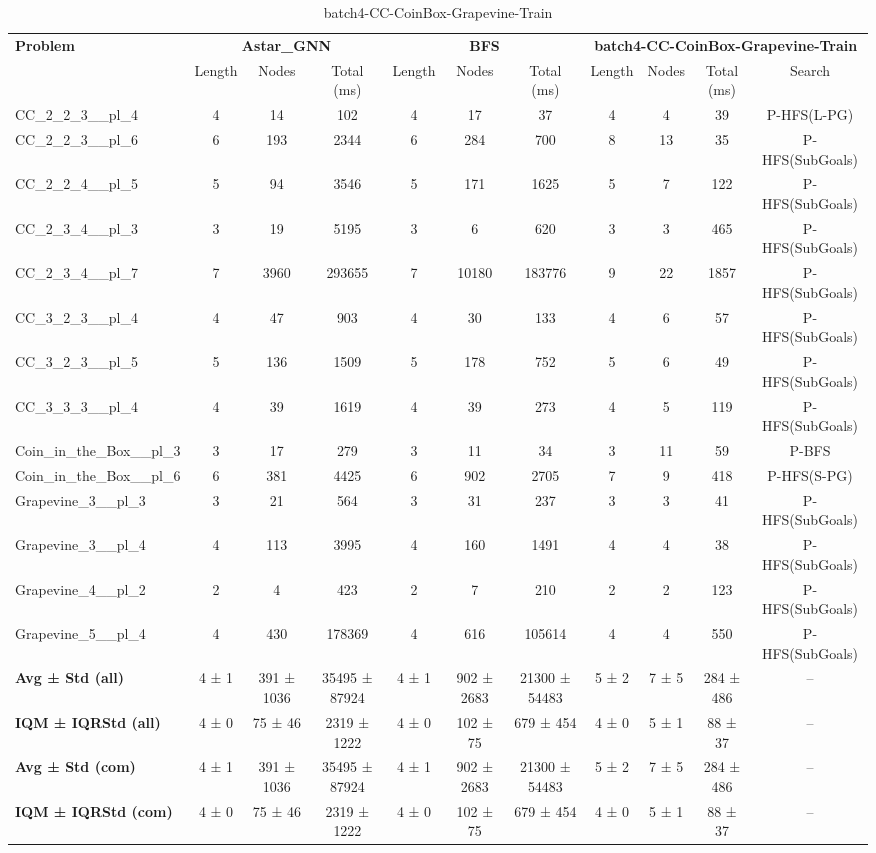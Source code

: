 \begin{table}[!ht]
\centering
\scriptsize
\begin{tabular}{l|ccc|ccc|cccc}
\multirow{2}{*}{\textbf{Problem}} & \multicolumn{3}{c|}{\textbf{Astar\_GNN}} & \multicolumn{3}{c|}{\textbf{BFS}} & \multicolumn{4}{c}{\textbf{batch4-CC-CoinBox-Grapevine-Train}} \\
\cline{2-11}
& Length & Nodes & Total (ms) & Length & Nodes & Total (ms) & Length & Nodes & Total (ms) & Search \\
\hline
CC\_2\_2\_3\_\_pl\_4 & 4 & 14 & 102 & 4 & 17 & 37 & 4 & 4 & 39 & P-HFS(L-PG) \\
CC\_2\_2\_3\_\_pl\_6 & 6 & 193 & 2344 & 6 & 284 & 700 & 8 & 13 & 35 & P-HFS(SubGoals) \\
CC\_2\_2\_4\_\_pl\_5 & 5 & 94 & 3546 & 5 & 171 & 1625 & 5 & 7 & 122 & P-HFS(SubGoals) \\
CC\_2\_3\_4\_\_pl\_3 & 3 & 19 & 5195 & 3 & 6 & 620 & 3 & 3 & 465 & P-HFS(SubGoals) \\
CC\_2\_3\_4\_\_pl\_7 & 7 & 3960 & 293655 & 7 & 10180 & 183776 & 9 & 22 & 1857 & P-HFS(SubGoals) \\
CC\_3\_2\_3\_\_pl\_4 & 4 & 47 & 903 & 4 & 30 & 133 & 4 & 6 & 57 & P-HFS(SubGoals) \\
CC\_3\_2\_3\_\_pl\_5 & 5 & 136 & 1509 & 5 & 178 & 752 & 5 & 6 & 49 & P-HFS(SubGoals) \\
CC\_3\_3\_3\_\_pl\_4 & 4 & 39 & 1619 & 4 & 39 & 273 & 4 & 5 & 119 & P-HFS(SubGoals) \\
Coin\_in\_the\_Box\_\_pl\_3 & 3 & 17 & 279 & 3 & 11 & 34 & 3 & 11 & 59 & P-BFS \\
Coin\_in\_the\_Box\_\_pl\_6 & 6 & 381 & 4425 & 6 & 902 & 2705 & 7 & 9 & 418 & P-HFS(S-PG) \\
Grapevine\_3\_\_pl\_3 & 3 & 21 & 564 & 3 & 31 & 237 & 3 & 3 & 41 & P-HFS(SubGoals) \\
Grapevine\_3\_\_pl\_4 & 4 & 113 & 3995 & 4 & 160 & 1491 & 4 & 4 & 38 & P-HFS(SubGoals) \\
Grapevine\_4\_\_pl\_2 & 2 & 4 & 423 & 2 & 7 & 210 & 2 & 2 & 123 & P-HFS(SubGoals) \\
Grapevine\_5\_\_pl\_4 & 4 & 430 & 178369 & 4 & 616 & 105614 & 4 & 4 & 550 & P-HFS(SubGoals) \\
\hline
\textbf{Avg ± Std (all)} & 4 ± 1 & 391 ± 1036 & 35495 ± 87924 & 4 ± 1 & 902 ± 2683 & 21300 ± 54483 & 5 ± 2 & 7 ± 5 & 284 ± 486 & -- \\
\textbf{IQM ± IQRStd (all)} & 4 ± 0 & 75 ± 46 & 2319 ± 1222 & 4 ± 0 & 102 ± 75 & 679 ± 454 & 4 ± 0 & 5 ± 1 & 88 ± 37 & -- \\
\textbf{Avg ± Std (com)} & 4 ± 1 & 391 ± 1036 & 35495 ± 87924 & 4 ± 1 & 902 ± 2683 & 21300 ± 54483 & 5 ± 2 & 7 ± 5 & 284 ± 486 & -- \\
\textbf{IQM ± IQRStd (com)} & 4 ± 0 & 75 ± 46 & 2319 ± 1222 & 4 ± 0 & 102 ± 75 & 679 ± 454 & 4 ± 0 & 5 ± 1 & 88 ± 37 & -- \\
\end{tabular}
\caption{batch4-CC-CoinBox-Grapevine-Train}
\label{tab:batch4_CC-CoinBox-Grapevine_comparison_train}
\end{table}

